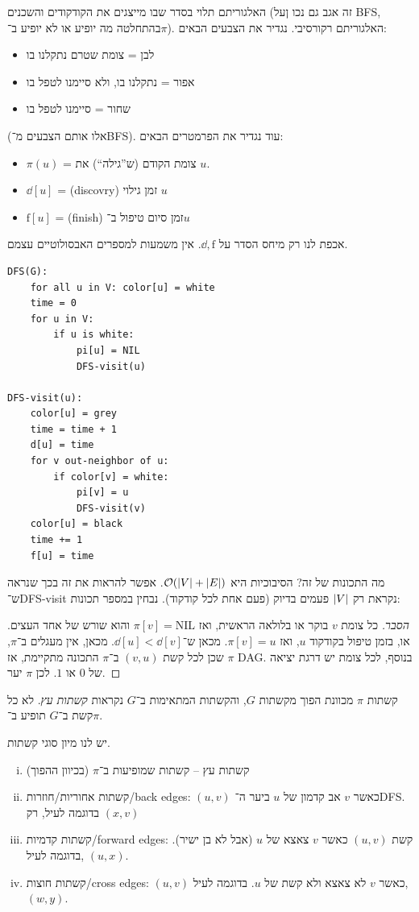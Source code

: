 \documentclass[]{../../../../tex/classes/styledArticle}
\newcommand\ff{\mathrm{f}}
\begin{document}
	האלגוריתם תלוי בסדר שבו מייצגים את הקודקודים והשכנים (זה אגב גם נכו ןעל BFS, בהתחלטה מה יופיע או לא יופיע ב־$\pi$). האלגוריתם רקורסיבי. נגדיר את הצבעים הבאים: 
	\begin{itemize}
		\item לבן = צומת שטרם נתקלנו בו
		\item אפור = נתקלנו בו, ולא סיימנו לטפל בו
		\item שחור = סיימנו לטפל בו
	\end{itemize}
	
	(אלו אותם הצבעים מ־BFS). עוד נגדיר את הפרמטרים הבאים: 
	\begin{itemize}
		\item $\pi(u)$ = צומת הקודם (ש''גילה``) את $u$. 
		\item $\dd[u]$ = (discovry) זמן גילוי $u$
		\item $\ff[u]$ = (finish) זמן סיום טיפול ב־$u$
	\end{itemize}
	אכפת לנו רק מיחס הסדר על $\dd, \ff$. אין משמעות למספרים האבסולוטיים עצמם. 
	
	\sen
	\begin{lstlisting}
DFS(G):
	for all u in V: color[u] = white
	time = 0
	for u in V: 
		if u is white: 
			pi[u] = NIL
			DFS-visit(u)

DFS-visit(u): 
	color[u] = grey
	time = time + 1
	d[u] = time
	for v out-neighbor of u: 
		if color[v] = white: 
			pi[v] = u
			DFS-visit(v)
	color[u] = black
	time += 1
	f[u] = time
	\end{lstlisting}
	\she
	
	מה התכונות של זה? הסיבוכיות היא $\mathcal{O}(\left \lvert V \right \rvert + \left \lvert E \right \rvert)$. אפשר להראות את זה בכך שנראה ש־DFS-visit נקראת רק $\left \lvert V \right \rvert$ פעמים בדיוק (פעם אחת לכל קודקוד). נבחין במספר תכונות: 
	
	\begin{proof}[הסבר]
		כל צומת $v$ בוקר או בלולאה הראשית, ואז $\pi[v] = \mathrm{NIL}$ והוא שורש של אחד העצים. או, בזמן טיפול בקודקוד $u$, ואז $\pi[v] = u$. מכאן ש־$\dd[u] < \dd[v]$. מכאן, אין מעגלים ב־$\pi$, שכן לכל קשת $(v, u)$ ב־$\pi$ התכונה מתקיימת, אז $\pi$ DAG. בנוסף, לכל צומת יש דרגת יציאה של $0$ או $1$. לכן $\pi$ יער. 
	\end{proof}
		
		קשתות $\pi$ מכוונת הפוך מקשתות $G$, והקשתות המתאימות ב־$G$ נקראות \textit{קשתות עץ}. לא כל קשת ב־$G$ תופיע ב־$\pi$. 
		
		יש לנו מיון סוגי קשתות. 
		\begin{enumerate}[i. ]
			\item קשתות עץ – קשתות שמופיעות ב־$\pi$ (בכיוון ההפוך)
			\item קשתות אחוריות/חוזרות/back edges: $(u, v)$ כאשר $v$ אב קדמון של $u$ ביער ה־DFS. בדוגמה לעיל, רק $(x, v)$
			\item קשתות קדמיות/forward edges: קשת $(u, v)$ כאשר $v$ צאצא של $u$ (אבל לא בן ישיר). בדוגמה לעיל,  $(u, x)$. 
			\item קשתות חוצות/cross edges: $(u, v)$ כאשר $v$ לא צאצא ולא קשת של $u$. בדוגמה לעיל, $(w, y)$. 
		\end{enumerate}
		
\end{document}

